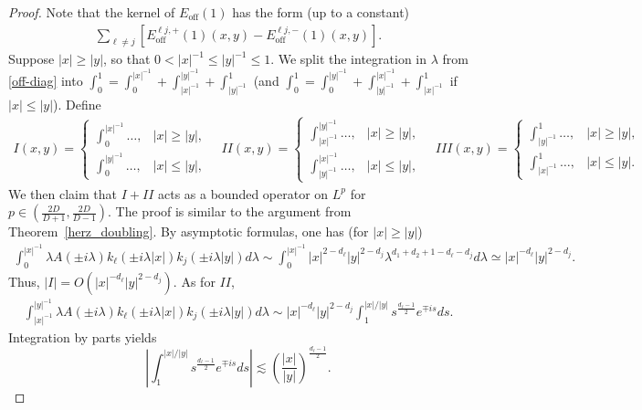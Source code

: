 \documentclass[10pt,a4paper]{amsart}
\begin{document}
\begin{proof}
Note that the kernel of $E_{\mathrm{off}}(1)$ has the form (up to a constant)
\begin{align}\label{off-diag}
    \sum_{\ell \ne j} \left[ E_{\mathrm{off}}^{\ell j,+}(1)(x,y) - E_{\mathrm{off}}^{\ell j,-}(1)(x,y)  \right].
\end{align}
Suppose $|x|\ge |y|$, so that $0<|x|^{-1}\le |y|^{-1} \le 1$. We split the integration in $\lambda$ from \eqref{off-diag} into $\int_0^1 = \int_0^{|x|^{-1}} + \int_{|x|^{-1}}^{|y|^{-1}} + \int_{|y|^{-1}}^1$ (and $\int_0^1 = \int_0^{|y|^{-1}} + \int_{|y|^{-1}}^{|x|^{-1}} + \int_{|x|^{-1}}^1$ if $|x|\le |y|$). Define
\begin{align*}
    I(x,y) = \begin{cases}
        \int_0^{|x|^{-1}} \dots, & |x|\ge |y|,\\
        \int_0^{|y|^{-1}}\dots, & |x|\le |y|,
    \end{cases}\quad
    II(x,y) = \begin{cases}
        \int_{|x|^{-1}}^{|y|^{-1}} \dots, & |x|\ge |y|,\\
    \int_{|y|^{-1}}^{|x|^{-1}}\dots, & |x|\le |y|,
    \end{cases}\quad
    III(x,y) = \begin{cases}
        \int_{|y|^{-1}}^1 \dots, & |x|\ge |y|,\\
    \int_{|x|^{-1}}^1\dots, & |x|\le |y|.
    \end{cases}
\end{align*}
We then claim that $I+II$ acts as a bounded operator on $L^p$ for $p\in \left( \frac{2D}{D+1}, \frac{2D}{D-1} \right)$. The proof is similar to the argument from Theorem~\ref{herz_doubling}. By asymptotic formulas, one has (for $|x|\ge |y|$)
\begin{align*}
     \int_0^{|x|^{-1}} \lambda A(\pm i\lambda) k_\ell(\pm i\lambda|x|) k_j(\pm i\lambda|y|) d\lambda \sim \int_0^{|x|^{-1}} |x|^{2-d_\ell} |y|^{2-d_j} \lambda^{d_1+d_2+1-d_\ell-d_j} d\lambda \simeq |x|^{-d_\ell} |y|^{2-d_j}.
\end{align*}
Thus, $|I| = O(|x|^{-d_\ell} |y|^{2-d_j})$. As for $II$, 
\begin{align*}
    \int_{|x|^{-1}}^{|y|^{-1}} \lambda A(\pm i\lambda) k_\ell(\pm i\lambda|x|) k_j(\pm i\lambda|y|) d\lambda \sim |x|^{-d_\ell} |y|^{2-d_j} \int_1^{|x|/|y|} s^{\frac{d_\ell-1}{2}} e^{\mp i s} ds.
\end{align*}
Integration by parts yields
\begin{equation*}
    \left|\int_1^{|x|/|y|} s^{\frac{d_\ell-1}{2}} e^{\mp i s} ds\right|\lesssim \left( \frac{|x|}{|y|} \right)^{\frac{d_\ell-1}{2}}.

\end{equation*}
\end{proof}
\end{document}
